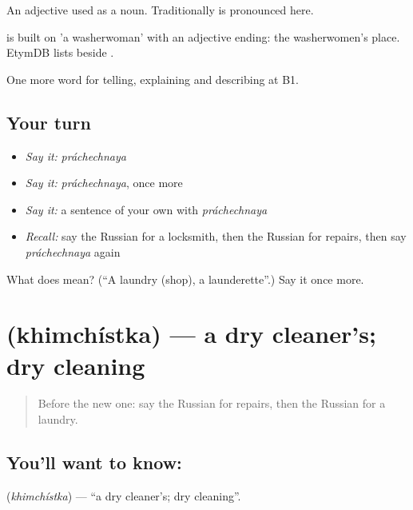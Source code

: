 An adjective used as a noun. Traditionally \emph{} is pronounced \emph{} here.

\begin{cousinweb}
\emph{} is built on \emph{} 'a washerwoman' with an adjective ending: the washerwomen's place. EtymDB lists \emph{} beside \emph{}.
\end{cousinweb}

\begin{grammarlens}[title={What you've built}]
One more word for telling, explaining and describing at B1.
\end{grammarlens}

\subsection*{Your turn}
\begin{itemize}
\raggedright
  \item \emph{Say it:} \emph{práchechnaya}
  \item \emph{Say it:} \emph{práchechnaya}, once more
  \item \emph{Say it:} a sentence of your own with \emph{práchechnaya}
  \item \emph{Recall:} say the Russian for a locksmith, then the Russian for repairs, then say \emph{práchechnaya} again
\end{itemize}

\begin{tcolorbox}[breakable,colback=teal!4,colframe=teal!35!black,title={Before you move on}]
What does  mean? (\textquotedblleft{}A laundry (shop), a launderette\textquotedblright{}.) Say it once more.
\end{tcolorbox}
\section[\texorpdfstring{\ru{химчистка} (khimchístka)}{химчистка (khimchístka)}]{ (khimchístka) — a dry cleaner's; dry cleaning}

\label{lesson:RU-C448-khimchistka}



\begin{quote}
Before the new one: say the Russian for repairs, then the Russian for a laundry.
\end{quote}

\subsection*{You'll want to know: }
\textbf{} (\emph{khimchístka}) — \textquotedblleft{}a dry cleaner's; dry cleaning\textquotedblright{}.

